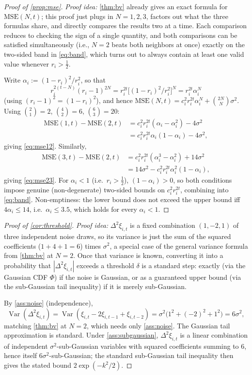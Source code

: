 \documentclass{article}
\theoremstyle{plain}
\theoremstyle{definition}
\theoremstyle{remark}
\DeclareMathOperator{\Var}{Var}
\begin{document}
\begin{proof}[Proof of \cref{prop:mse}]
\emph{Proof idea:} \cref{thm:bv} already gives an exact formula for $\mathrm{MSE}(N,t)$; this proof just plugs in $N=1,2,3$, factors out what the three formulas share, and directly compares the results two at a time. Each comparison reduces to checking the sign of a single quantity, and both comparisons can be satisfied simultaneously (i.e., $N=2$ beats both neighbors at once) exactly on the two-sided band in \cref{eq:band}, which turns out to always contain at least one valid value whenever $r_i>\tfrac12$.

Write $\alpha_i := (1-r_i)^2/r_i^2$, so that
\[
r_i^{2(t-N)}(r_i-1)^{2N} = r_i^{2t}\big[(1-r_i)^2/r_i^2\big]^N = r_i^{2t}\alpha_i^N
\]
(using $(r_i-1)^2=(1-r_i)^2$), and hence $\mathrm{MSE}(N,t) = c_i^2 r_i^{2t}\alpha_i^N + \binom{2N}N\sigma^2$. Using $\binom21=2$, $\binom42=6$, $\binom63=20$:
\begin{align*}
\mathrm{MSE}(1,t)-\mathrm{MSE}(2,t) &= c_i^2r_i^{2t}(\alpha_i-\alpha_i^2) - 4\sigma^2 \\
&= c_i^2r_i^{2t}\alpha_i(1-\alpha_i)-4\sigma^2,
\end{align*}
giving \cref{eq:mse12}. Similarly,
\begin{align*}
\mathrm{MSE}(3,t)-\mathrm{MSE}(2,t) &= c_i^2r_i^{2t}(\alpha_i^3-\alpha_i^2) + 14\sigma^2 \\
&= 14\sigma^2 - c_i^2r_i^{2t}\alpha_i^2(1-\alpha_i),
\end{align*}
giving \cref{eq:mse23}. For $\alpha_i<1$ (i.e.\ $r_i>\tfrac12$), $(1-\alpha_i)>0$, so both conditions impose genuine (non-degenerate) two-sided bounds on $c_i^2r_i^{2t}$, combining into \cref{eq:band}. Non-emptiness: the lower bound does not exceed the upper bound iff $4\alpha_i\le14$, i.e.\ $\alpha_i\le3.5$, which holds for every $\alpha_i<1$.
\end{proof}

\begin{proof}[Proof of \cref{cor:threshold}]
\emph{Proof idea:} $\Delta^2\xi_{i,t}$ is a fixed combination $(1,-2,1)$ of three independent noise draws, so its variance is just the sum of the squared coefficients ($1+4+1=6$) times $\sigma^2$, a special case of the general variance formula from \cref{thm:bv} at $N=2$. Once that variance is known, converting it into a probability that $|\Delta^2\xi_{i,t}|$ exceeds a threshold $\delta$ is a standard step: exactly (via the Gaussian CDF $\Phi$) if the noise is Gaussian, or as a guaranteed upper bound (via the sub-Gaussian tail inequality) if it is merely sub-Gaussian.

By \cref{ass:noise} (independence),
\[
\Var(\Delta^2\xi_{i,t}) = \Var(\xi_{i,t}-2\xi_{i,t-1}+\xi_{i,t-2}) = \sigma^2\big(1^2+(-2)^2+1^2\big) = 6\sigma^2,
\]
matching \cref{thm:bv} at $N=2$, which needs only \cref{ass:noise}. The Gaussian tail approximation is standard. Under \cref{ass:subgaussian}, $\Delta^2\xi_{i,t}$ is a linear combination of independent $\sigma^2$-sub-Gaussian variables with squared coefficients summing to $6$, hence itself $6\sigma^2$-sub-Gaussian; the standard sub-Gaussian tail inequality then gives the stated bound $2\exp(-k^2/2)$.
\end{proof}
\end{document}
